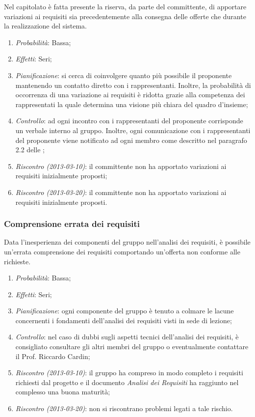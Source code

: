 Nel capitolato è fatta presente la riserva, da parte del committente, di apportare variazioni ai requisiti sia precedentemente alla consegna delle offerte che durante la realizzazione del sistema.

\begin{enumerate}
\item \textit{Probabilità}: Bassa;
\item \textit{Effetti}: Seri;
\item \textit{Pianificazione}: si cerca di coinvolgere quanto più possibile il proponente mantenendo un contatto diretto con i rappresentanti. Inoltre, la probabilità di occorrenza di una variazione ai requisiti è ridotta grazie alla competenza dei rappresentati la quale determina una visione più chiara del quadro d'insieme;
\item \textit{Controllo}: ad ogni incontro con i rappresentanti del proponente corrisponde un verbale interno al gruppo. Inoltre, ogni comunicazione con i rappresentanti del proponente viene notificato ad ogni membro come descritto nel paragrafo 2.2 delle \NormeDiProgetto;
\item \textit{Riscontro (2013-03-10)}: il committente non ha apportato variazioni ai requisiti inizialmente proposti;
\item \textit{Riscontro (2013-03-20)}: il committente non ha apportato variazioni ai requisiti inizialmente proposti.
\end{enumerate}
		
		\subsubsection{Comprensione errata dei requisiti}

Data l'inesperienza dei componenti del gruppo nell'analisi dei requisiti, è possibile un'errata comprensione dei requisiti comportando un'offerta non conforme alle richieste.

\begin{enumerate}
\item \textit{Probabilità}: Bassa;
\item \textit{Effetti}: Seri;
\item \textit{Pianificazione}: ogni componente del gruppo è tenuto a colmare le lacune concernenti i fondamenti dell'analisi dei requisiti visti in sede di lezione;
\item \textit{Controllo}: nel caso di dubbi sugli aspetti tecnici dell'analisi dei requisiti, è consigliato consultare gli altri membri del gruppo o eventualmente contattare il Prof. Riccardo Cardin;
\item \textit{Riscontro (2013-03-10)}: il gruppo ha compreso in modo completo i requisiti richiesti dal progetto e il documento \textit{Analisi dei Requisiti} ha raggiunto nel complesso una buona maturità;
\item \textit{Riscontro (2013-03-20)}: non si riscontrano problemi legati a tale rischio.
\end{enumerate}

